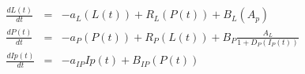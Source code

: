 \documentclass{article}
\begin{document}
\begin{eqnarray*}
  \frac{dL(t)}{dt} &=& -a_{L}(L(t)) + R_{L}(P(t)) + B_{L}(A_{p}) \\
  \frac{dP(t)}{dt} &=& -a_{P}(P(t)) + R_{P}(L(t)) + B_{P}\frac{A_{L}}{1+D_{P}(I_{P}(t))} \\
  \frac{dIp(t)}{dt} &=& -a_{IP}Ip(t) + B_{IP}(P(t))
\end{eqnarray*}
\end{document}
